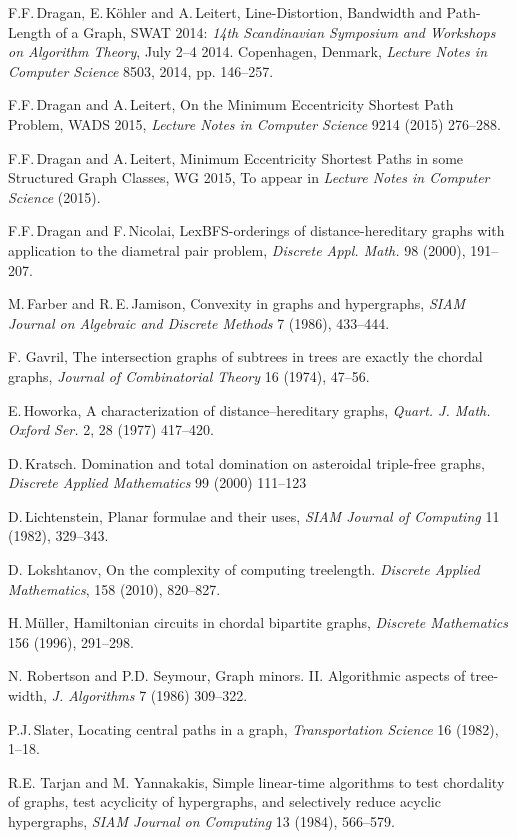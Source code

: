 \documentclass[10pt]{llncs}
\begin{document}
\begin{thebibliography}{99}
    F.F.\,Dragan, E.\,Köhler and A.\,Leitert,
    Line-Distortion, Bandwidth and Path-Length of a Graph,
    SWAT 2014: \emph{14th Scandinavian Symposium and Workshops on Algorithm Theory}, July 2--4 2014. Copenhagen, Denmark, \emph{Lecture Notes in Computer Science} 8503, 2014, pp. 146--257.

    F.F.\,Dragan and A.\,Leitert,
    On the Minimum Eccentricity Shortest Path Problem,
    WADS 2015, \emph{Lecture Notes in Computer Science} 9214 (2015) 276--288.

    F.F.\,Dragan and A.\,Leitert,
    Minimum Eccentricity Shortest Paths in some Structured Graph Classes,
    WG 2015, To appear in \emph{Lecture Notes in Computer Science} (2015).

    F.F.\,Dragan and F.\,Nicolai,
    LexBFS-orderings of distance-hereditary graphs with application to the diametral pair problem, 
    \emph{Discrete Appl. Math.} 98 (2000), 191--207.

    M.\,Farber and R.\,E.\,Jamison,
    Convexity in graphs and hypergraphs,
    \emph{SIAM Journal on Algebraic and Discrete Methods} 7 (1986), 433–444.

     F. Gavril,
     The intersection graphs of subtrees in trees are exactly the chordal graphs,
     \emph{Journal of Combinatorial Theory} 16 (1974), 47--56.

    E.\,Howorka,
    A characterization of distance--hereditary graphs, 
    \emph{Quart. J. Math. Oxford Ser.} 2, 28 (1977) 417--420.

    D.\,Kratsch. 
    Domination and total domination on asteroidal triple-free graphs, 
    \emph{Discrete Applied Mathematics} 99 (2000) 111--123

    D.\,Lichtenstein,
    Planar formulae and their uses,
    \emph{SIAM Journal of Computing} 11 (1982), 329--343.

    D. Lokshtanov,
    On the complexity of computing treelength.
    \emph{Discrete Applied Mathematics}, 158 (2010), 820--827.

    H.\,Müller,
    Hamiltonian circuits in chordal bipartite graphs,
    \emph{Discrete Mathematics} 156 (1996), 291--298.

    N. Robertson and P.D. Seymour,
    Graph minors. II. Algorithmic aspects of tree-width,
    \emph{J. Algorithms} 7 (1986) 309--322.

    P.J.\,Slater,
   Locating central paths in a graph,
    \emph{Transportation Science} 16 (1982), 1--18.

    R.E. Tarjan and M. Yannakakis,
    Simple linear-time algorithms to test chordality of graphs, test acyclicity of hypergraphs, and selectively reduce acyclic hypergraphs,
    \emph{SIAM Journal on Computing} 13 (1984), 566--579.

\end{thebibliography}
\end{document}
